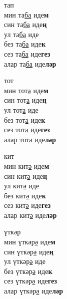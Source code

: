 \begin{multicols}{4}
\begin{enumerate}
\begin{minipage}{\linewidth}
    \item
    тап\\
    мин та\underline{ба} иде\textbf{м}\\
    син та\underline{ба} иде\textbf{ң}\\
    ул та\underline{ба} иде\\
    без та\underline{ба} иде\textbf{к}\\
    сез та\underline{ба} иде\textbf{гез}\\
    алар та\underline{ба} иде\textbf{ләр}\\
\end{minipage}

\begin{minipage}{\linewidth}
    \item
    тот\\
    мин тот\underline{а} иде\textbf{м}\\
    син тот\underline{а} иде\textbf{ң}\\
    ул тот\underline{а} иде\\
    без тот\underline{а} иде\textbf{к}\\
    сез тот\underline{а} иде\textbf{гез}\\
    алар тот\underline{а} иде\textbf{ләр}\\
\end{minipage}

\begin{minipage}{\linewidth}
    \item
    кит\\
    мин кит\underline{ә} иде\textbf{м}\\
    син кит\underline{ә} иде\textbf{ң}\\
    ул кит\underline{ә} иде\\
    без кит\underline{ә} иде\textbf{к}\\
    сез кит\underline{ә} иде\textbf{гез}\\
    алар кит\underline{ә} иде\textbf{ләр}\\
\end{minipage}

\begin{minipage}{\linewidth}
    \item
    үткәр\\
    мин үткәр\underline{ә} иде\textbf{м}\\
    син үткәр\underline{ә} иде\textbf{ң}\\
    ул үткәр\underline{ә} иде\\
    без үткәр\underline{ә} иде\textbf{к}\\
    сез үткәр\underline{ә} иде\textbf{гез}\\
    алар үткәр\underline{ә} иде\textbf{ләр}\\
\end{minipage}


\end{enumerate}
\end{multicols}
